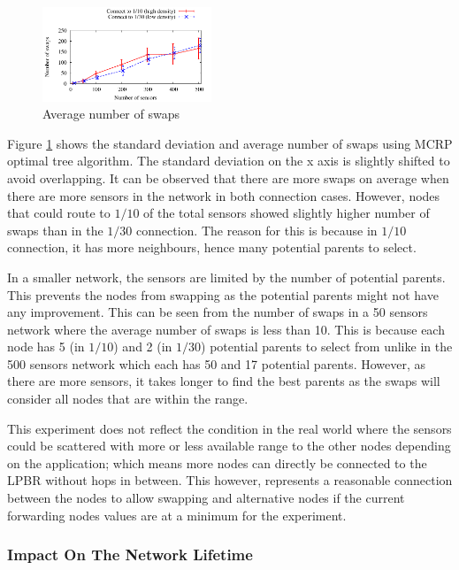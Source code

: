 \begin{figure}
\centering
\includegraphics[width=0.45\textwidth]{figures/swaps.pdf}
\caption{Average number of swaps}
\label{fig:aveSwaps}
\end{figure}

Figure \ref{fig:aveSwaps} shows the standard deviation and average number of swaps using MCRP optimal tree algorithm. 
The standard deviation on the x axis is slightly shifted to avoid overlapping.
It can be observed that there are more swaps on average when there are more sensors in the network in both connection cases. However, nodes that could route to $1/10$ of the total sensors showed slightly higher number of swaps than in the $1/30$ connection. The reason for this is because in $1/10$ connection, it has more neighbours, hence many potential parents to select. 

In a smaller network, the sensors are limited by the number of potential parents. This prevents the nodes from swapping as the potential parents might not have any improvement. This can be seen from the number of swaps in a 50 sensors network where the average number of swaps is less than 10. This is because each node has 5 (in $1/10$) and 2 (in $1/30$) potential parents to select from unlike in the 500 sensors network which each has 50 and 17 potential parents. However, as there are more sensors, it takes longer to find the best parents as the swaps will consider all nodes that are within the range.

This experiment does not reflect the condition in the real world where the sensors could be scattered with more or less available range to the other nodes depending on the application; which means more nodes can directly be connected to the LPBR without hops in between. This however, represents a reasonable connection between the nodes to allow swapping and alternative nodes if the current forwarding nodes values are at a minimum for the experiment.

\subsubsection{Impact On The Network Lifetime}

